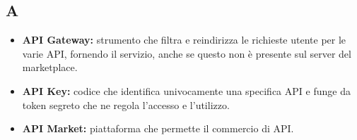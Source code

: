 \subsection{A}
\begin{itemize}
	\item \textbf{API Gateway:} strumento che filtra e reindirizza le richieste utente per le varie API, fornendo il servizio, anche se questo non è presente sul server del marketplace.
	\item \textbf{API Key:} codice che identifica univocamente una specifica API e funge da token segreto che ne regola l'accesso e l'utilizzo.
	\item \textbf{API Market:} piattaforma che permette il commercio di API.
\end{itemize}